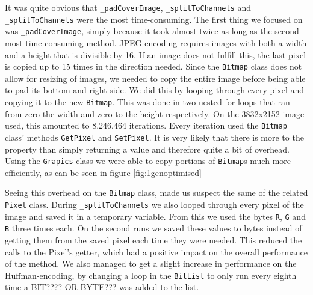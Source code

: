 It was quite obvious that \lstinline|_padCoverImage|, \lstinline|_splitToChannels| and \lstinline|_splitToChannels| were the most time-consuming.
The first thing we focused on was \lstinline|_padCoverImage|, simply because it took almost twice as long as the second most time-consuming method.
JPEG-encoding requires images with both a width and a height that is divisible by 16.
If an image does not fulfill this, the last pixel is copied up to 15 times in the direction needed.
Since the \lstinline|Bitmap| class does not allow for resizing of images, we needed to copy the entire image before being able to pad its bottom and right side.
We did this by looping through every pixel and copying it to the new \lstinline|Bitmap|.
This was done in two nested for-loops that ran from zero the width and zero to the height respectively.
On the 3832x2152 image used, this amounted to 8,246,464 iterations. 
Every iteration used the \lstinline|Bitmap| class' methods \lstinline|GetPixel| and \lstinline|SetPixel|.
It is very likely that there is more to the property than simply returning a value and therefore quite a bit of overhead.
Using the \lstinline|Grapics| class we were able to copy portions of \lstinline|Bitmap|s much more efficiently, \citep{MSDNBitmap} as can be seen in figure \ref{fig:1genoptimised}

Seeing this overhead on the \lstinline|Bitmap| class, made us suspect the same of the related \lstinline|Pixel| class. 
During \lstinline|_splitToChannels| we also looped through every pixel of the image and saved it in a temporary variable. 
From this we used the bytes \lstinline|R|, \lstinline|G| and \lstinline|B| three times each. 
On the second runs we saved these values to bytes instead of getting them from the saved pixel each time they were needed.
This reduced the calls to the Pixel's getter, which had a positive impact on the overall performance of the method.
We also managed to get a slight increase in performance on the Huffman-encoding, by changing a loop in the \lstinline|BitList| to only run every eighth time a BIT???? OR BYTE??? was added to the list.


